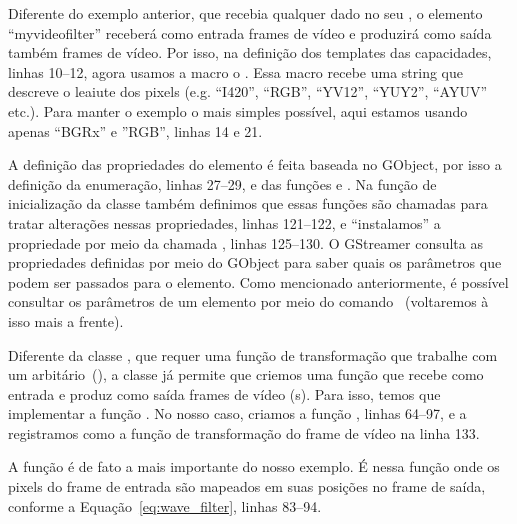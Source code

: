 Diferente do exemplo anterior, que recebia qualquer dado no seu ,
o elemento ``myvideofilter'' receberá como entrada frames de vídeo e produzirá
como saída também frames de vídeo.  Por isso, na definição dos templates das
capacidades, linhas 10--12, agora usamos a macro o .
Essa macro recebe uma string que descreve o leaiute dos pixels (e.g. ``I420'',
``RGB'', ``YV12'', ``YUY2'', ``AYUV'' etc.).  Para manter o exemplo o mais
simples possível, aqui estamos usando apenas ``BGRx'' e ''RGB'', linhas 14 e
21.

\begin{sloppypar}
A definição das propriedades do elemento é feita baseada no 
GObject, por isso a definição da enumeração, linhas 27--29, e das funções
 e .  Na
função de inicialização da classe  também
definimos que essas funções são chamadas para tratar alterações nessas
propriedades, linhas 121--122, e ``instalamos'' a propriedade por meio da
chamada , linhas 125--130.  O GStreamer consulta
as propriedades definidas por meio do GObject para saber quais os parâmetros
que podem ser passados para o elemento.  Como mencionado anteriormente, é
possível consultar os parâmetros de um elemento por meio do comando
~(voltaremos à isso mais a frente).
\end{sloppypar}

Diferente da classe , que requer uma função de transformação que
trabalhe com um  arbitário~(), a classe
 já permite que criemos uma função que recebe como entrada e
produz como saída frames de vídeo (s).  Para isso, temos que
implementar a função .  No nosso caso, criamos a função
, linhas 64--97, e a registramos como a função
de transformação do frame de vídeo na linha 133.

A função  é de fato a mais importante do nosso exemplo.
É nessa função onde os pixels do frame de entrada são mapeados em suas posições
no frame de saída, conforme a Equação~\ref{eq:wave_filter}, linhas 83--94.

